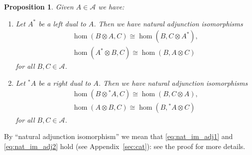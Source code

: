 \documentclass[a4paper,11pt]{article}
\theoremstyle{plain}
\newtheorem{proposition}{Proposition}[section]
\theoremstyle{remark}
\newcommand{\mc}[1]{\mathcal{#1}}
\begin{document}
\begin{proposition}
Given $A\in\mc A$ we have:
\begin{enumerate}
  \item Let $A^*$ be a left dual to $A$.  Then we have natural adjunction isomorphisms
  \begin{gather}
    \hom(B\otimes A, C) \cong \hom(B, C\otimes A^*),   \label{eq:frob_1}  \\
    \hom(A^*\otimes B, C) \cong \hom(B, A\otimes C)   \label{eq:frob_2}
  \end{gather}
  for all $B,C\in\mc A$.
  \item Let ${^*}A$ be a right dual to $A$.  Then we have natural adjunction isomorphisms
  \begin{gather}
    \hom(B\otimes {^*}A, C) \cong \hom(B, C\otimes A),   \label{eq:frob_1r}  \\
    \hom(A\otimes B, C) \cong \hom(B, {^*}A\otimes C)   \label{eq:frob_2r}
  \end{gather}
  for all $B,C\in\mc A$.
\end{enumerate}
\end{proposition}

By ``natural adjunction isomorphism'' we mean that \eqref{eq:nat_im_adj1} and \eqref{eq:nat_im_adj2} hold (see Appendix~\ref{sec:cat}): see the proof for more details.
\end{document}
